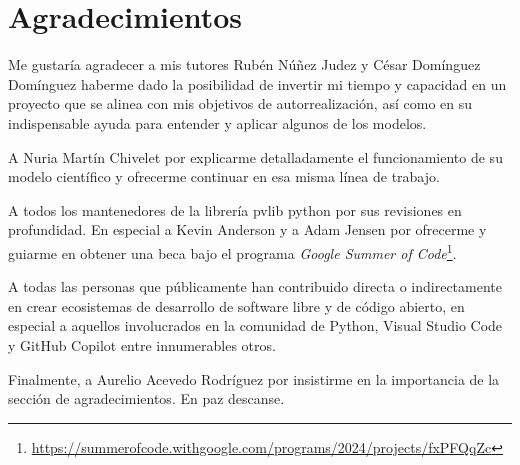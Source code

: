\chapter*{Agradecimientos} \label{chp:agrad}

Me gustaría agradecer a mis tutores Rubén Núñez Judez y César Domínguez Domínguez haberme dado la posibilidad de invertir mi tiempo y capacidad en un proyecto que se alinea con mis objetivos de autorrealización, así como en su indispensable ayuda para entender y aplicar algunos de los modelos.

A Nuria Martín Chivelet por explicarme detalladamente el funcionamiento de su modelo científico y ofrecerme continuar en esa misma línea de trabajo.

A todos los mantenedores de la librería pvlib python por sus revisiones en profundidad. En especial a Kevin Anderson y a Adam Jensen por ofrecerme y guiarme en obtener una beca bajo el programa \textit{Google Summer of Code}\footnote{\url{https://summerofcode.withgoogle.com/programs/2024/projects/fxPFQqZc}}.

A todas las personas que públicamente han contribuido directa o indirectamente en crear ecosistemas de desarrollo de software libre y de código abierto, en especial a aquellos involucrados en la comunidad de Python, Visual Studio Code y GitHub Copilot entre innumerables otros.

Finalmente, a Aurelio Acevedo Rodríguez por insistirme en la importancia de la sección de agradecimientos. En paz descanse.
